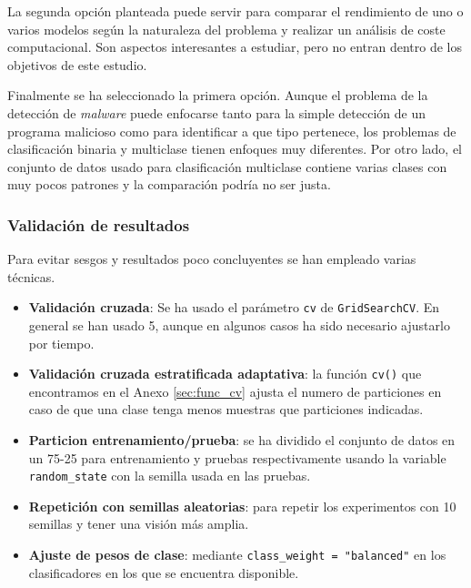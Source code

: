 \vspace{1em}

La segunda opción planteada puede servir para comparar el rendimiento de uno o varios modelos según la naturaleza del problema y realizar un análisis de coste computacional. Son aspectos interesantes a estudiar, pero no entran dentro de los objetivos de este estudio.

\vspace{1em}

Finalmente se ha seleccionado la primera opción. Aunque el problema de la detección de \textit{malware} puede enfocarse tanto para la simple detección de un programa malicioso como para identificar a que tipo pertenece, los problemas de clasificación binaria y multiclase tienen enfoques muy diferentes. Por otro lado, el conjunto de datos usado para clasificación multiclase contiene varias clases con muy pocos patrones y la comparación podría no ser justa.

\newpage
\subsubsection{Validación de resultados}
\label{subsubsec:validacion}

Para evitar sesgos y resultados poco concluyentes se han empleado varias técnicas.

\begin{itemize}
	\item \textbf{Validación cruzada}: Se ha usado el parámetro \texttt{cv} de \texttt{GridSearchCV}. En general se han usado 5, aunque en algunos casos ha sido necesario ajustarlo por tiempo.
	\item \textbf{Validación cruzada estratificada adaptativa}: la función \texttt{cv()} que encontramos en el Anexo \ref{sec:func_cv} ajusta el numero de particiones en caso de que una clase tenga menos muestras que particiones indicadas.
	\item \textbf{Particion entrenamiento/prueba}: se ha dividido el conjunto de datos en un 75-25 para entrenamiento y pruebas respectivamente usando la variable \texttt{random\_state} con la semilla usada en las pruebas.
	\item \textbf{Repetición con semillas aleatorias}: para repetir los experimentos con 10 semillas y tener una visión más amplia.
	\item \textbf{Ajuste de pesos de clase}: mediante \texttt{class\_weight = "balanced"} en los clasificadores en los que se encuentra disponible.
\end{itemize}

